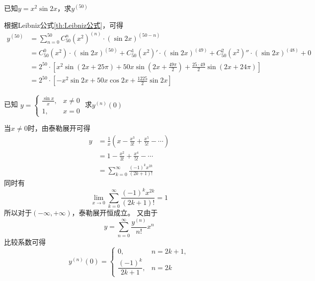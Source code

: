 \begin{example}
    已知$y=x^2\sin 2x$，求$y^{(50)}$
\end{example}
\begin{solution}
    根据Leibniz公式\ref{th:Leibniz公式}，可得
    \begin{align}
        y^{(50)} & = \sum_{n=0}^{50} C_{50}^n (x^2)^{(n)}\cdot(\sin 2x)^{(50-n)}                                                       \\
                 & = C_{50}^0(x^2)\cdot(\sin 2x)^{(50)} + C_{50}^1(x^2)'\cdot(\sin 2x)^{(49)} + C_{50}^2(x^2)''\cdot(\sin 2x)^{(48)}+0 \\
                 & = 2^{50}\cdot \left[ x^2 \sin(2x+25\pi) + 50x\sin(2x+\frac{49\pi}{2})+\frac{25 \cdot 49}{2}\sin(2x+24\pi) \right]   \\
                 & = 2^{50}\cdot\left[ -x^2\sin 2x + 50x\cos 2x + \frac{1225}{2}\sin 2x \right]
    \end{align}
\end{solution}

\begin{example}
    已知
    \begin{math}
        y =
        \begin{cases}
            \frac{\sin x}{x}, & x \neq 0 \\
            1,                & x = 0
        \end{cases}
    \end{math}
    求$y^{(n)}(0)$
\end{example}
\begin{solution}
    当$x\neq 0$时，由泰勒展开可得
    \begin{align}
        y & = \frac{1}{x}(x - \frac{x^3}{3!} + \frac{x^5}{5!} - \cdots) \\
          & = 1-\frac{x^2}{3!}+\frac{x^4}{5!}-\cdots                    \\
          & =\sum_{k=0}^\infty \frac{(-1)^{k}x^{2k}}{(2k+1)!}
    \end{align}
    同时有
    \[ \lim_{x \to 0} \sum_{k=0}^\infty \frac{(-1)^{k}x^{2k}}{(2k+1)!} = 1 \]
    所以对于$(-\infty,+\infty)$，泰勒展开恒成立。
    又由于
    \[ y = \sum_{n=0}^{\infty}\frac{y^{(n)}}{n!}x^{n} \]
    比较系数可得
    \[
        y^{(n)}(0) =
        \begin{cases}
            0,                      & n = 2k+1, \\
            \dfrac{(-1)^{k}}{2k+1}, & n=2k
        \end{cases}
    \]
\end{solution}

